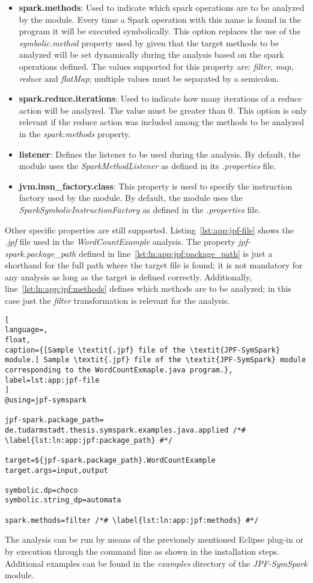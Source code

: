 \begin{itemize}
	\item \textbf{spark.methods}: Used to indicate which spark operations are to be analyzed by the module. Every time a Spark operation with this name is found in the program it will be executed symbolically. This option replaces the use of the \textit{symbolic.method} property used by \spf{} given that the target methods to be analyzed will be set dynamically during the analysis based on the spark operations defined. The values supported for this property are: \textit{filter}, \textit{map}, \textit{reduce} and \textit{flatMap}; multiple values must be separated by a semicolon.
	\item \textbf{spark.reduce.iterations}: Used to indicate how many iterations of a reduce action will be analyzed. The value must be greater than 0. This option is only relevant if the reduce action was included among the methods to be analyzed in the \textit{spark.methods} property.
	\item \textbf{listener}: Defines the listener to be used during the analysis. By default, the module uses the \textit{SparkMethodListener} as defined in its \textit{.properties} file.
	\item \textbf{jvm.insn\_factory.class}: This property is used to specify the instruction factory used by the module. By default, the module uses the \textit{SparkSymbolicInstructionFactory} as defined in the \textit{.properties} file.
\end{itemize}

Other \spf{} specific properties are still supported. Listing~\ref{lst:app:jpf-file} shows the \textit{.jpf} file used in the \textit{WordCountExample} analysis. The property \textit{jpf-spark.package\_path} defined in line~\ref{lst:ln:app:jpf:package_path} is just a shorthand for the full path where the target file is found; it is not mandatory for any analysis as long as the target is defined correctly. Additionally, line~\ref{lst:ln:app:jpf:methods} defines which methods are to be analyzed; in this case just the \textit{filter} transformation is relevant for the analysis.

\begin{lstlisting}[
language=,
float,
caption={[Sample \textit{.jpf} file of the \textit{JPF-SymSpark} module.] Sample \textit{.jpf} file of the \textit{JPF-SymSpark} module corresponding to the WordCountExmaple.java program.},
label=lst:app:jpf-file
]
@using=jpf-symspark

jpf-spark.package_path= de.tudarmstadt.thesis.symspark.examples.java.applied /*# \label{lst:ln:app:jpf:package_path} #*/

target=${jpf-spark.package_path}.WordCountExample
target.args=input,output

symbolic.dp=choco
symbolic.string_dp=automata

spark.methods=filter /*# \label{lst:ln:app:jpf:methods} #*/
\end{lstlisting}

The analysis can be run by means of the previously mentioned Eclipse plug-in or by execution through the command line as shown in the installation steps. Additional examples can be found in the \textit{examples} directory of the \textit{JPF-SymSpark} module.